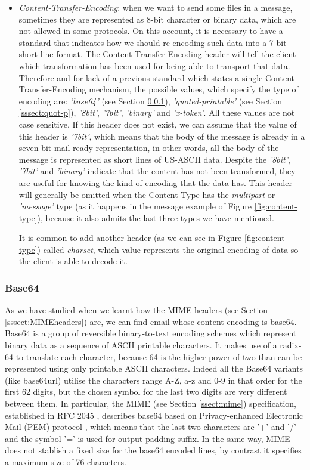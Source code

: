 \begin{itemize}
	\item\textit{Content-Transfer-Encoding}: when we want to send some files in a message, sometimes they are represented as 8-bit character or binary data, which are not allowed in some protocols. On this account, it is necessary to have a standard that indicates how we should re-encoding such data into a 7-bit short-line format. The Content-Transfer-Encoding header \citep[Section 5]{rfc1341} will tell the client which transformation has been used for being able to transport that data. Therefore and for lack of a previous standard which states a single Content-Transfer-Encoding mechanism, the possible values, which specify the type of encoding are: \textit{'base64'} (see Section \ref{sssect:base64}), \textit{'quoted-printable'} (see Section \ref{sssect:quot-p}), \textit{'8bit'}, \textit{'7bit'}, \textit{'binary'} and \textit{'x-token'}. All these values are not case sensitive. If this header does not exist, we can assume that the value of this header is \textit{'7bit'}, which means that the body of the message is already in a seven-bit mail-ready representation, in other words, all the body of the message is represented as short lines of US-ASCII data. Despite the \textit{'8bit'}, \textit{'7bit'} and \textit{'binary'} indicate that the content has not been transformed, they are useful for knowing the kind of encoding that the data has. This header will generally be omitted when the Content-Type has the \textit{multipart} or \textit{'message'} type (as it happens in the message example of Figure \ref{fig:content-type}), because it also admits the last three types we have mentioned.
	
	It is common to add another header (as we can see in Figure \ref{fig:content-type}) called \textit{charset}, which value represents the original encoding of data so the client is able to decode it.
\end{itemize}

\subsubsection{Base64} \label{sssect:base64}
As we have studied when we learnt how the MIME headers (see Section \ref{sssect:MIMEheaders}) are, we can find email whose content encoding is base64. Base64 \citep{wikibase64, rfc4648} is a group of reversible binary-to-text encoding schemes which represent binary data as a sequence of ASCII printable characters. It makes use of a radix-64 to translate each character, because 64 is the higher power of two than can be represented using only printable ASCII characters. Indeed all the Base64 variants (like base64url) utilise the characters range A-Z, a-z and 0-9 in that order for the first 62 digits, but the chosen symbol for the last two digits are very different between them. In particular, the MIME (see Section \ref{ssect:mime}) specification, established in RFC 2045 \citep{rfc2045}, describes base64 based on  Privacy-enhanced Electronic Mail (PEM) protocol \citep{wikipem, rfc7468}, which means that the last two characters are '+' and '/' and the symbol '=' is used for output padding suffix. In the same way, MIME does not stablish a fixed size for the base64 encoded lines, by contrast it specifies a maximum size of 76 characters.


